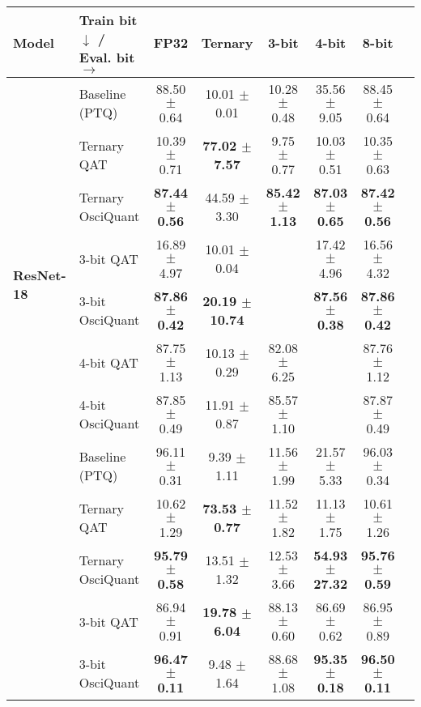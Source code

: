 \begin{table*}[t]
\centering
\tiny
\begin{tabular}{llcccccc}
\toprule
{\bf Model} & {\bf Train bit} $\downarrow$ / {\bf Eval. bit} $\rightarrow$ & {\bf FP32} & {\bf Ternary} & {\bf 3-bit} & {\bf 4-bit} & {\bf 8-bit} \\
\midrule
\multirow{8}{*}{\bf ResNet-18} 
 & Baseline (PTQ) & \cellcolor{gray!25} 88.50 $\pm$ 0.64 & 10.01 $\pm$ 0.01 & 10.28 $\pm$ 0.48 & 35.56 $\pm$ 9.05 & 88.45 $\pm$ 0.64 \\
 \cmidrule(lr){2-7}
 & Ternary QAT & 10.39 $\pm$ 0.71 & \cellcolor{gray!25}\textbf{77.02 $\pm$ 7.57} & 9.75 $\pm$ 0.77 & 10.03 $\pm$ 0.51 & 10.35 $\pm$ 0.63 \\
 & Ternary OsciQuant & \textbf{87.44 $\pm$ 0.56} & \cellcolor{gray!25}44.59 $\pm$ 3.30 & \textbf{85.42 $\pm$ 1.13} & \textbf{87.03 $\pm$ 0.65} & \textbf{87.42 $\pm$ 0.56} \\
 \cmidrule(lr){2-7}
 & 3-bit QAT & 16.89 $\pm$ 4.97 & 10.01 $\pm$ 0.04 & \cellcolor{gray!25}{85.69 $\pm$ 1.83} & 17.42 $\pm$ 4.96 & 16.56 $\pm$ 4.32 \\
 & 3-bit OsciQuant & \textbf{87.86 $\pm$ 0.42} & \textbf{20.19 $\pm$ 10.74} & \cellcolor{gray!25}{84.94 $\pm$ 1.59} & \textbf{87.56 $\pm$ 0.38} & \textbf{87.86 $\pm$ 0.42} \\
 \cmidrule(lr){2-7}
 & 4-bit QAT & {87.75 $\pm$ 1.13} & {10.13 $\pm$ 0.29} & {82.08 $\pm$ 6.25} & \cellcolor{gray!25}{87.71 $\pm$ 1.14} & {87.76 $\pm$ 1.12} \\
 & 4-bit OsciQuant & {87.85 $\pm$ 0.49} & {11.91 $\pm$ 0.87} & {85.57 $\pm$ 1.10} & \cellcolor{gray!25}{87.08 $\pm$ 0.72} & {87.87 $\pm$ 0.49} \\
\midrule
\multirow{8}{*}{\bf Tiny ViT}
 & Baseline (PTQ) & \cellcolor{gray!25}96.11 $\pm$ 0.31 & 9.39 $\pm$ 1.11 & 11.56 $\pm$ 1.99 & 21.57 $\pm$ 5.33 & 96.03 $\pm$ 0.34 \\
 \cmidrule(lr){2-7} 
 & Ternary QAT & 10.62 $\pm$ 1.29 & \cellcolor{gray!25} {\bf 73.53 $\pm$ 0.77} & 11.52 $\pm$ 1.82 & 11.13 $\pm$ 1.75 & 10.61 $\pm$ 1.26 \\
 & Ternary OsciQuant & {\bf 95.79 $\pm$ 0.58} & \cellcolor{gray!25} 13.51 $\pm$ 1.32 & 12.53 $\pm$ 3.66 & {\bf 54.93 $\pm$ 27.32} & {\bf 95.76 $\pm$ 0.59} \\
 \cmidrule(lr){2-7}
 & 3-bit QAT & 86.94 $\pm$ 0.91 & {\bf 19.78 $\pm$ 6.04} & \cellcolor{gray!25}88.13 $\pm$ 0.60 & 86.69 $\pm$ 0.62 & 86.95 $\pm$ 0.89 \\
 & 3-bit OsciQuant & {\bf 96.47 $\pm$ 0.11} & 9.48 $\pm$ 1.64 & \cellcolor{gray!25}88.68 $\pm$ 1.08 & {\bf 95.35 $\pm$ 0.18} & {\bf 96.50 $\pm$ 0.11} \\

\end{tabular}
\end{table*}
